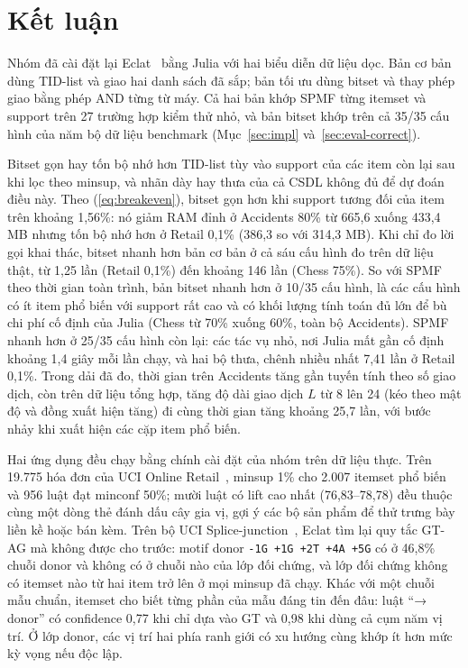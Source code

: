 \section{Kết luận}
\label{sec:conclusion}

Nhóm đã cài đặt lại Eclat~\cite{zaki2000scalable} bằng Julia với hai biểu diễn dữ liệu dọc. Bản cơ bản dùng
TID-list và giao hai danh sách đã sắp; bản tối ưu dùng bitset và thay phép giao bằng phép AND từng từ máy. Cả hai
bản khớp SPMF từng itemset và support trên 27 trường hợp kiểm thử nhỏ, và bản bitset khớp trên cả 35/35 cấu hình
của năm bộ dữ liệu benchmark (Mục~\ref{sec:impl} và~\ref{sec:eval-correct}).

Bitset gọn hay tốn bộ nhớ hơn TID-list tùy vào support của các item còn lại sau khi lọc theo minsup, và nhãn dày
hay thưa của cả CSDL không đủ để dự đoán điều này. Theo (\ref{eq:breakeven}), bitset gọn hơn khi support tương đối
của item trên khoảng 1,56\%: nó giảm RAM đỉnh ở Accidents 80\% từ 665,6 xuống 433,4 MB nhưng tốn bộ nhớ hơn ở
Retail 0,1\% (386,3 so với 314,3 MB). Khi chỉ đo lời gọi khai thác, bitset nhanh hơn bản cơ bản ở cả sáu cấu hình
đo trên dữ liệu thật, từ 1,25 lần (Retail 0,1\%) đến khoảng 146 lần (Chess 75\%). So với SPMF
theo thời gian toàn trình, bản bitset nhanh hơn ở 10/35 cấu hình, là các cấu hình có ít item phổ biến với support rất
cao và có khối lượng tính toán đủ lớn để bù chi phí cố định của Julia (Chess từ 70\% xuống 60\%, toàn bộ Accidents). SPMF nhanh hơn ở 25/35 cấu hình còn lại: các tác vụ nhỏ, nơi Julia mất gần
cố định khoảng 1,4 giây mỗi lần chạy, và hai bộ thưa, chênh nhiều nhất 7,41 lần ở Retail 0,1\%. Trong dải đã đo,
thời gian trên Accidents tăng gần tuyến tính theo số giao dịch, còn trên dữ liệu tổng hợp, tăng độ dài giao dịch
$L$ từ 8 lên 24 (kéo theo mật độ và đồng xuất hiện tăng) đi cùng thời gian tăng khoảng 25,7 lần, với bước nhảy
khi xuất hiện các cặp item phổ biến.

Hai ứng dụng đều chạy bằng chính cài đặt của nhóm trên dữ liệu thực. Trên 19.775 hóa đơn của UCI Online
Retail~\cite{chen2015onlineretail}, minsup 1\% cho 2.007 itemset phổ biến và 956 luật đạt minconf 50\%; mười luật có
lift cao nhất (76,83--78,78) đều thuộc cùng một dòng thẻ đánh dấu cây gia vị, gợi ý các bộ sản phẩm để thử trưng
bày liền kề hoặc bán kèm. Trên bộ UCI Splice-junction~\cite{uci1991splice}, Eclat tìm lại quy tắc GT-AG mà
không được cho trước: motif donor \texttt{-1G +1G +2T +4A +5G} có ở 46,8\% chuỗi donor và không có ở chuỗi nào của
lớp đối chứng, và lớp đối chứng không có itemset nào từ hai item trở lên ở mọi minsup đã chạy. Khác với một chuỗi
mẫu chuẩn, itemset cho biết từng phần của mẫu đáng tin đến đâu: luật ``→ donor'' có confidence 0,77 khi chỉ dựa vào GT và 0,98 khi dùng cả cụm năm
vị trí. Ở lớp donor, các vị trí hai phía ranh giới có xu hướng cùng khớp ít hơn mức kỳ vọng nếu độc lập.

